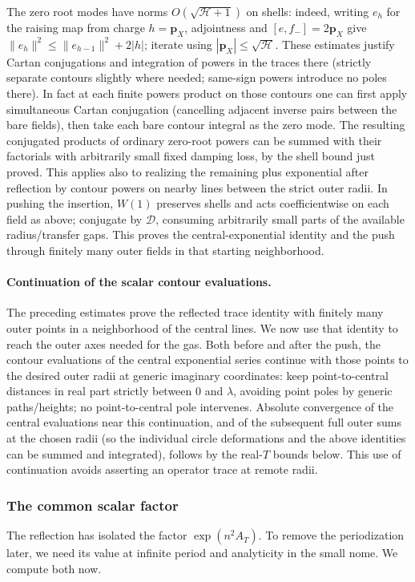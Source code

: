 The zero root modes have norms \(O(\sqrt{\mathcal H+1})\) on shells: indeed, writing \(e_h\) for the raising map from charge \(h=\mathbf p_X\), adjointness and \([e,f_-]=2\mathbf p_X\) give \(\|e_h\|^2\le\|e_{h-1}\|^2+2|h|\); iterate using \(|\mathbf p_X|\le\sqrt{\mathcal H}\). These estimates justify Cartan conjugations and integration of powers in the traces there (strictly separate contours slightly where needed; same-sign powers introduce no poles there). In fact at each finite powers product on those contours one can first apply simultaneous Cartan conjugation (cancelling adjacent inverse pairs between the bare fields), then take each bare contour integral as the zero mode. The resulting conjugated products of ordinary zero-root powers can be summed with their factorials with arbitrarily small fixed damping loss, by the shell bound just proved. This applies also to realizing the remaining plus exponential after reflection by contour powers on nearby lines between the strict outer radii. In pushing the insertion, \(W(1)\) preserves shells and acts coefficientwise on each field as above; conjugate by \(\mathcal D\), consuming arbitrarily small parts of the available radius/transfer gaps. This proves the central-exponential identity and the push through finitely many outer fields in that starting neighborhood.

\paragraph{Continuation of the scalar contour evaluations.}
The preceding estimates prove the reflected trace identity with finitely
many outer points in a neighborhood of the central lines. We now use
that identity to reach the outer axes needed for the gas.
Both before and after the push, the contour evaluations of the central exponential series continue with those points to the desired outer radii at generic imaginary coordinates: keep point-to-central distances in real part strictly between 0 and \(\lambda\), avoiding point poles by generic paths/heights; no point-to-central pole intervenes. Absolute convergence of the central evaluations near this continuation, and of the subsequent full outer sums at the chosen radii (so the individual circle deformations and the above identities can be summed and integrated), follows by the real-\(T\) bounds below. This use of continuation avoids asserting an operator trace at remote radii.

\subsubsection{The common scalar factor}
The reflection has isolated the factor \(\exp(n^2A_T)\). To remove the
periodization later, we need its value at infinite period and analyticity
in the small nome. We compute both now.

